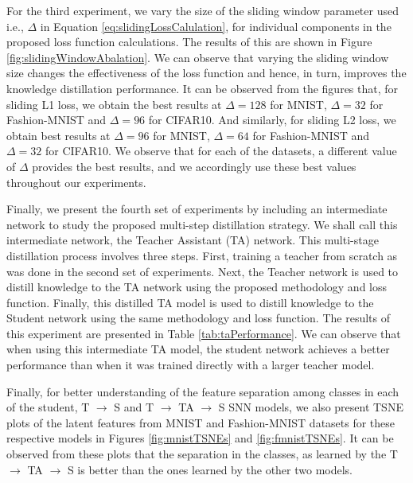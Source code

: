 \documentclass{article}
\begin{document}
For the third experiment, we vary the size of the sliding window parameter used i.e., $\Delta$ in Equation \ref{eq:slidingLossCalulation}, for individual components in the proposed loss function calculations. The results of this are shown in Figure \ref{fig:slidingWindowAbalation}. We can observe that varying the sliding window size changes the effectiveness of the loss function and hence, in turn, improves the knowledge distillation performance. It can be observed from the figures that, for sliding L1 loss, we obtain the best results at $\Delta =128$ for MNIST, $\Delta = 32$ for Fashion-MNIST and $\Delta = 96$ for CIFAR10. And  similarly, for sliding L2 loss, we obtain best results at $\Delta = 96$ for MNIST, $\Delta = 64$ for Fashion-MNIST and $\Delta = 32$ for CIFAR10. We observe that for each of the datasets, a different value of $\Delta$ provides the best results, and we accordingly use these best values throughout our experiments.

Finally, we present the fourth set of experiments by including an intermediate network to study the proposed multi-step distillation strategy. We shall call this intermediate network, the Teacher Assistant (TA) network. This multi-stage distillation process involves three steps. First, training a teacher from scratch as was done in the second set of experiments. Next, the Teacher network is used to distill knowledge to the TA network using the proposed methodology and loss function. Finally, this distilled TA model is used to distill knowledge to the Student network using the same methodology and loss function. The results of this experiment are presented in Table \ref{tab:taPerformance}. We can observe that when using this intermediate TA model, the student network achieves a better performance than when it was trained directly with a larger teacher model.

Finally, for better understanding of the feature separation among classes in each of the student, T $\rightarrow$ S and T $\rightarrow$ TA $\rightarrow$ S SNN models, we also present TSNE plots of the latent features from MNIST and Fashion-MNIST datasets for these respective models in Figures \ref{fig:mnistTSNEs} and \ref{fig:fmnistTSNEs}. It can be observed from these plots that the separation in the classes, as learned by the T $\rightarrow$ TA $\rightarrow$ S is better than the ones learned by the other two models.
\end{document}
